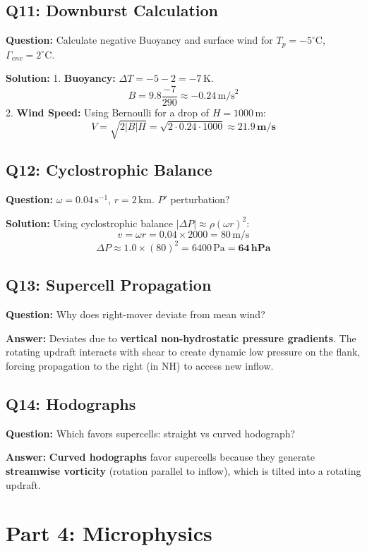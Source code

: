 \documentclass[11pt,a4paper]{article}
\begin{document}
\subsection*{Q11: Downburst Calculation}
\textbf{Question:} Calculate negative Buoyancy and surface wind for $T_p=-5^{\circ}\text{C}$, $\Gamma_{env}=2^{\circ}\text{C}$.

\textbf{Solution:}
1. \textbf{Buoyancy:} $\Delta T = -5 - 2 = -7\,\text{K}$.
\[ B = 9.8 \frac{-7}{290} \approx -0.24\,\text{m/s}^2 \]
2. \textbf{Wind Speed:} Using Bernoulli for a drop of $H=1000\,\text{m}$:
\[ V = \sqrt{2 |B| H} = \sqrt{2 \cdot 0.24 \cdot 1000} \approx \mathbf{21.9\,\text{m/s}} \]

\subsection*{Q12: Cyclostrophic Balance}
\textbf{Question:} $\omega=0.04\,\text{s}^{-1}$, $r=2\,\text{km}$. $P'$ perturbation?

\textbf{Solution:}
Using cyclostrophic balance $|\Delta P| \approx \rho (\omega r)^2$:
\[ v = \omega r = 0.04 \times 2000 = 80\,\text{m/s} \]
\[ \Delta P \approx 1.0 \times (80)^2 = 6400\,\text{Pa} = \mathbf{64\,\text{hPa}} \]

\subsection*{Q13: Supercell Propagation}
\textbf{Question:} Why does right-mover deviate from mean wind?

\textbf{Answer:}
Deviates due to \textbf{vertical non-hydrostatic pressure gradients}. The rotating updraft interacts with shear to create dynamic low pressure on the flank, forcing propagation to the right (in NH) to access new inflow.

\subsection*{Q14: Hodographs}
\textbf{Question:} Which favors supercells: straight vs curved hodograph?

\textbf{Answer:}
\textbf{Curved hodographs} favor supercells because they generate \textbf{streamwise vorticity} (rotation parallel to inflow), which is tilted into a rotating updraft.

\section*{Part 4: Microphysics}
\end{document}
